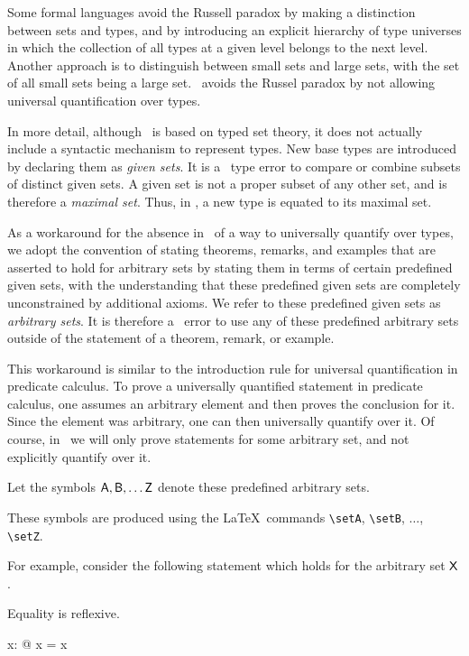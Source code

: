 \documentclass{amsart}
\begin{document}
Some formal languages avoid the Russell paradox by making a distinction between sets and types,
and by introducing an explicit hierarchy of type universes in which the collection of all types at a given level belongs to the next level.
Another approach is to distinguish between small sets and large sets, with the set of all small sets being a large set.
\ZN\ avoids the Russel paradox by not allowing universal quantification over types.

In more detail, although \ZN\ is based on typed set theory, 
it does not actually include a syntactic mechanism to represent types. 
New base types are introduced by declaring them as \textit{given sets}.
It is a \ZN\ type error to compare or combine subsets of distinct given sets.
A given set is not a proper subset of any other set, and is therefore a \textit{maximal set}.
Thus, in \ZN, a new type is equated to its maximal set.

As a workaround for the absence in \ZN\ of a way to universally quantify over types, 
we adopt the convention of stating theorems, remarks, and examples that are asserted to hold for arbitrary sets 
by stating them in terms of certain predefined given sets, with the understanding that these 
predefined given sets are completely unconstrained by additional axioms.
We refer to these predefined given sets as \textit{arbitrary sets}.
It is therefore a \mathz\ error to use any of these predefined arbitrary sets outside of the statement of a theorem, remark, or example.

This workaround is similar to the introduction rule for universal quantification in predicate calculus.
To prove a universally quantified statement in predicate calculus, one assumes an arbitrary element and then proves the conclusion for it.
Since the element was arbitrary, one can then universally quantify over it.
Of course, in \mathz\ we will only prove statements for some arbitrary set, and not explicitly quantify over it.

Let the symbols $\mathsf{A}, \mathsf{B}, \dots \mathsf{Z}$ denote these predefined arbitrary sets.
\begin{zed}
	[\setA, \setB, \setC, \setD, \setE, \setF, \setG, \setH, \setI, \setJ, \setK, \setL, \setM, 
	\setN, \setO, \setP, \setQ, \setR, \setS, \setT, \setU, \setV, \setW, \setX, \setY, \setZ]
\end{zed}
These symbols are produced using the \LaTeX\ commands \verb|\setA|, \verb|\setB|, $\dots$, \verb|\setZ|.

For example, consider the following statement which holds for the arbitrary set $\mathsf{X}$.
\begin{remark}
Equality is reflexive.
\begin{zed}
	\forall x: \setX @ x = x
\end{zed}
\end{remark}

\printbibliography
\end{document}
